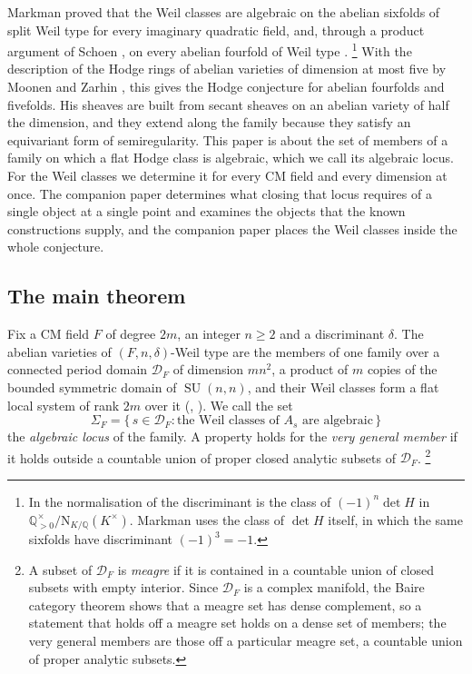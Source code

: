 \documentclass[11pt,reqno]{amsart}
\theoremstyle{plain}
\theoremstyle{definition}
\theoremstyle{remark}
\newcommand{\QQ}{\mathbb{Q}}
\newcommand{\cD}{\mathcal{D}}
\newcommand{\Nm}{\mathrm{N}}             %
\DeclareMathOperator{\SU}{SU}
\begin{document}
Markman proved that the Weil classes are algebraic on the abelian sixfolds of
split Weil type for every imaginary quadratic field, and, through a product
argument of Schoen \cite[Proposition~10]{Sch98}, on every abelian fourfold of
Weil type \cite{Mar25a,Mar25b}.%
\footnote{In the normalisation of  the discriminant is the
class of $(-1)^{n}\det H$ in $\QQ^{\times}_{>0}/\Nm_{K/\QQ}(K^{\times})$.
Markman uses the class of $\det H$ itself, in which the same sixfolds have
discriminant $(-1)^{3}=-1$.}
With the description of the Hodge rings of abelian varieties of dimension at
most five by Moonen and Zarhin \cite{MZ99}, this gives the Hodge conjecture
for abelian fourfolds and fivefolds. His sheaves are built from secant sheaves
on an abelian variety of half the dimension, and they extend along the family
because they satisfy an equivariant form of semiregularity. This paper is
about the set of members of a family on which a flat Hodge class is
algebraic, which we call its algebraic locus. For the Weil classes we
determine it for every CM field and every dimension at once. The companion
paper \cite{paperII} determines what closing that locus requires of a single
object at a single point and examines the objects that the known
constructions supply, and the companion paper \cite{paperIII} places the
Weil classes inside the whole conjecture.

\subsection{The main theorem}

Fix a CM field $F$ of degree $2m$, an integer $n\ge2$ and a discriminant
$\delta$. The abelian varieties of $(F,n,\delta)$-Weil type are the members of
one family over a connected period domain $\cD_{F}$ of dimension $mn^{2}$, a
product of $m$ copies of the bounded symmetric domain of $\SU(n,n)$, and their
Weil classes form a flat local system of rank $2m$ over it
(, ). We call the set
\[
  \Sigma_{F}=\{\,s\in\cD_{F}:\text{the Weil classes of }A_{s}\text{ are
  algebraic}\,\}
\]
the \emph{algebraic locus} of the family. A property holds for the
\emph{very general member} if it holds outside a countable union of proper
closed analytic subsets of $\cD_{F}$.%
\footnote{A subset of $\cD_{F}$ is \emph{meagre} if it is contained in a
countable union of closed subsets with empty interior. Since $\cD_{F}$ is a
complex manifold, the Baire category theorem shows that a meagre set has
dense complement, so a statement that holds off a meagre set holds on a dense
set of members; the very general members are those off a particular meagre
set, a countable union of proper analytic subsets.}
\end{document}
